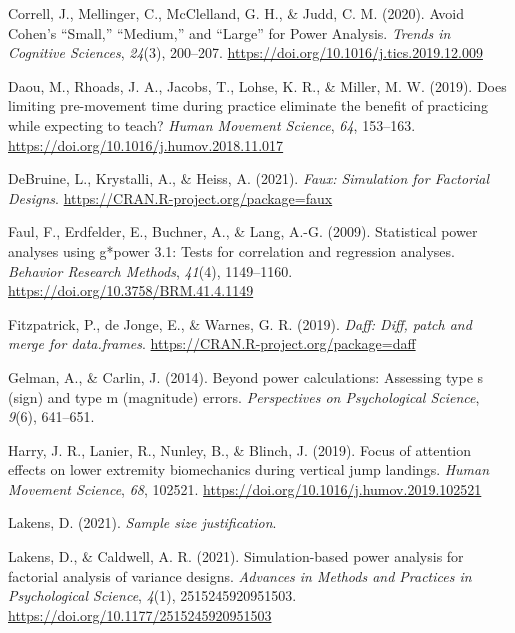 \documentclass[
  man, donotrepeattitle,mask,floatsintext]{apa7}
\newlength{\cslhangindent}
\newlength{\cslentryspacingunit} %
\newenvironment{CSLReferences}[2] %
 {%
  \setlength{\parindent}{0pt}
  \ifodd #1
  \let\oldpar\par
  \def\par{\hangindent=\cslhangindent\oldpar}
  \fi
  \setlength{\parskip}{#2\cslentryspacingunit}
 }%
 {}
\begin{document}
\begin{CSLReferences}{1}{0}
\leavevmode{}%
Correll, J., Mellinger, C., McClelland, G. H., \& Judd, C. M. (2020). Avoid {Cohen}'s {``{Small},''} {``{Medium},''} and {``{Large}''} for {Power} {Analysis}. \emph{Trends in Cognitive Sciences}, \emph{24}(3), 200--207. \url{https://doi.org/10.1016/j.tics.2019.12.009}

\leavevmode{}%
Daou, M., Rhoads, J. A., Jacobs, T., Lohse, K. R., \& Miller, M. W. (2019). Does limiting pre-movement time during practice eliminate the benefit of practicing while expecting to teach? \emph{Human Movement Science}, \emph{64}, 153--163. \url{https://doi.org/10.1016/j.humov.2018.11.017}

\leavevmode{}%
DeBruine, L., Krystalli, A., \& Heiss, A. (2021). \emph{Faux: {Simulation} for {Factorial} {Designs}}. \url{https://CRAN.R-project.org/package=faux}

\leavevmode{}%
Faul, F., Erdfelder, E., Buchner, A., \& Lang, A.-G. (2009). Statistical power analyses using g*power 3.1: Tests for correlation and regression analyses. \emph{Behavior Research Methods}, \emph{41}(4), 1149--1160. \url{https://doi.org/10.3758/BRM.41.4.1149}

\leavevmode{}%
Fitzpatrick, P., de Jonge, E., \& Warnes, G. R. (2019). \emph{Daff: Diff, patch and merge for data.frames}. \url{https://CRAN.R-project.org/package=daff}

\leavevmode{}%
Gelman, A., \& Carlin, J. (2014). Beyond power calculations: Assessing type s (sign) and type m (magnitude) errors. \emph{Perspectives on Psychological Science}, \emph{9}(6), 641--651.

\leavevmode{}%
Harry, J. R., Lanier, R., Nunley, B., \& Blinch, J. (2019). Focus of attention effects on lower extremity biomechanics during vertical jump landings. \emph{Human Movement Science}, \emph{68}, 102521. \url{https://doi.org/10.1016/j.humov.2019.102521}

\leavevmode{}%
Lakens, D. (2021). \emph{Sample size justification}.

\leavevmode{}%
Lakens, D., \& Caldwell, A. R. (2021). Simulation-based power analysis for factorial analysis of variance designs. \emph{Advances in Methods and Practices in Psychological Science}, \emph{4}(1), 2515245920951503. \url{https://doi.org/10.1177/2515245920951503}


\end{CSLReferences}
\end{document}
